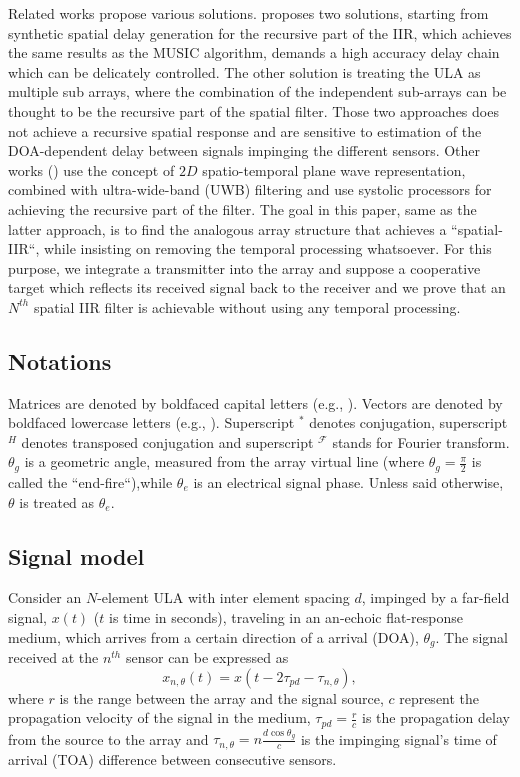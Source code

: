 Related works propose various solutions.
\cite{Wen2013ExtendingStructure} proposes two solutions, starting from synthetic spatial delay generation for the recursive part of the IIR, which achieves the same results as the MUSIC algorithm, demands a high accuracy delay chain which can be delicately controlled. The other solution is treating the ULA as multiple sub arrays, where the combination of the independent sub-arrays can be thought to be the recursive part of the spatial filter. Those two approaches does not achieve a recursive spatial response and are sensitive to estimation of the DOA-dependent delay between signals impinging the different sensors.
Other works (\cite{Madanayake2008AFilters,Madanayake2008ABeamformer}) use the concept of $2D$ spatio-temporal plane wave representation, combined with ultra-wide-band \cite{YangLiuqingandGiannakisUltra-widebandCome} (UWB) filtering and use systolic processors for achieving the recursive part of the filter.
The goal in this paper, same as the latter approach, is to find the analogous array structure that achieves a ``spatial-IIR``, while insisting on removing the temporal processing whatsoever. For this purpose, we integrate a transmitter into the array and suppose a cooperative target which reflects its received signal back to the receiver and we prove that an $N^{th}$ spatial IIR filter is achievable without using any temporal processing.
\subsection*{Notations}
Matrices are denoted by boldfaced capital letters (e.g., ). Vectors are denoted by boldfaced lowercase letters (e.g., ). Superscript $^{*}$ denotes conjugation, superscript $^{H}$ denotes transposed conjugation and superscript $^{\mathcal{F}}$ stands for Fourier transform. $\theta_{g}$ is a geometric angle, measured from the array virtual line (where $\theta_{g} = \frac{\pi}{2}$ is called the ``end-fire``),while $\theta_{e}$ is an electrical signal phase. Unless said otherwise, $\theta$ is treated as $\theta_{e}$.

\subsection*{Signal model}
Consider an $N$-element ULA with inter element spacing $d$, impinged by a far-field signal, $x\left(t\right)$ ($t$ is time in seconds), traveling in an an-echoic flat-response medium, which arrives from a certain direction of a arrival (DOA), $\theta_{g}$. The signal received at the $n^{th}$ sensor can be expressed as 
\begin{equation}
x_{n,\theta}(t) = x\left(t-2\tau_{pd}-\tau_{n,\theta}\right),
\label{eqn:noFeedbackULA_singleSensor_temporal}
\end{equation}
where $r$ is the range between the array and the signal source, $c$ represent the propagation velocity of the signal in the medium, $\tau_{pd} = \frac{r}{c}$ is the propagation delay from the source to the array and $\tau_{n,\theta} = n\frac{d\cos{\theta_{g}}}{c}$ is the impinging signal's time of arrival (TOA) difference between consecutive sensors. 
